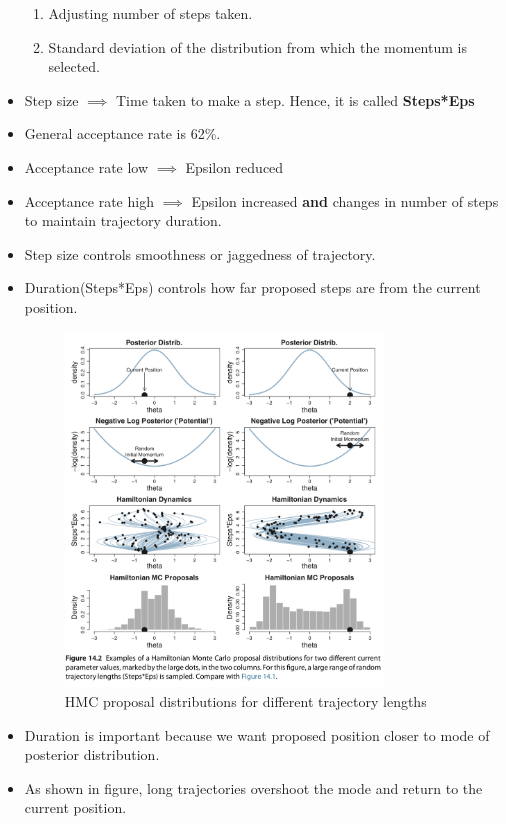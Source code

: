 \documentclass[a4paper]{article}
\begin{document}
\begin{itemize}
\begin{enumerate}
        \item Adjusting number of steps taken.
        \item Standard deviation of the distribution from which the momentum is selected.
    \end{enumerate}
    \item Step size $\implies$ Time taken to make a step. Hence, it is called \textbf{Steps*Eps}  
    \item General acceptance rate is 62\%.
    \item Acceptance rate low $\implies$ Epsilon reduced
    \item Acceptance rate high $\implies$ Epsilon increased \textbf{and} changes in number of steps to maintain trajectory duration. 
    \item Step size controls smoothness or jaggedness of trajectory.
    \item Duration(Steps*Eps) controls how far proposed steps are from the current position.
    \begin{figure}[H]
        \centering
        \includegraphics[width=0.8\textwidth]{trajectory_lengths}
        \caption{HMC proposal distributions for different trajectory lengths}
        \label{fig:trajectory_lengths}
    \end{figure}
    \item Duration is important because we want proposed position closer to mode of posterior distribution.
    \item As shown in figure, long trajectories overshoot the mode and return to the current position.

\end{itemize}
\end{document}
